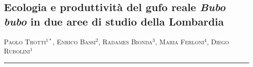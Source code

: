 \setcounter{figure}{0}
\setcounter{table}{0}

\begin{adjustwidth}{-3.5cm}{0cm}
\pagestyle{CIOpage}
\chapter*[Ecologia del gufo reale in due aree lombarde]{Ecologia e produttivit\`a del gufo reale \textbf{\textit{Bubo
bubo}}\textbf{ in due aree di studio della Lombardia}}

\textsc{Paolo Trotti}$^{1*}$, \textsc{Enrico Bassi}$^{2}$, 
\textsc{Radames Bionda}$^{3}$, \textsc{Maria Ferloni}$^{4}$, 
\textsc{Diego Rubolini}$^{1}$\\

    
\noindent\color{MUSEBLUE}\rule{27cm}{2pt}
\vspace{1cm}
\end{adjustwidth}



